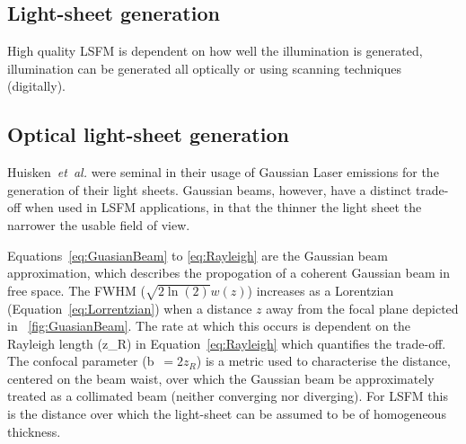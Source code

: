 


%

\subsection{Light-sheet generation}

High quality \gls{LSFM} is dependent on how well the illumination is generated, illumination can be generated all optically or using scanning techniques (digitally).

\subsection{Optical \gls{light-sheet} generation}


Huisken~\emph{et~al.} were seminal in their usage of Gaussian \gls{Laser} emissions for the generation of their light sheets.
\gls{Gaussian beam}s, however, have a distinct trade-off when used in LSFM applications, in that the thinner the light sheet the narrower the usable field of view.

Equations~\eqref{eq:GuasianBeam} to \eqref{eq:Rayleigh} are the Gaussian beam approximation, which describes the propogation of a coherent Gaussian beam in free space.
The \gls{FWHM} ($\sqrt{2\ln(2)}w(z)$) %
increases as a \gls{Lorentzian} (Equation~\eqref{eq:Lorrentzian}) when a distance $z$ away from the focal plane depicted in \figurename~\ref{fig:GuasianBeam}.
The rate at which this occurs is dependent on the \gls{Rayleigh length} (\gls{z_R}) in Equation~\eqref{eq:Rayleigh} which quantifies the trade-off.
The confocal parameter (\gls{b}~$=2z_R$) is a metric used to characterise the distance, centered on the beam waist, over which the Gaussian beam be approximately treated as a collimated beam (neither converging nor diverging).
For \gls{LSFM} this is the distance over which the \gls{light-sheet} can be assumed to be of homogeneous thickness.

